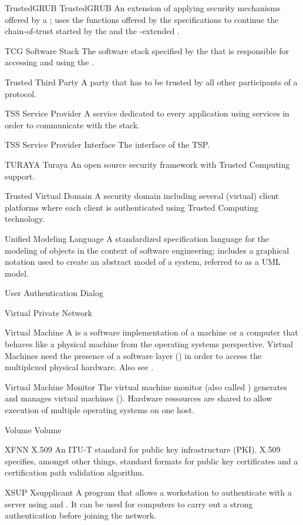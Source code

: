 \glosentry
    {TrustedGRUB}
    {TrustedGRUB}
    {An extension of \GRUB applying security mechanisms offered by a \TPM; uses
the \RTM functions offered by the \TCG specifications to continue the
chain-of-trust started by the \CRTM and the \TCG-extended \BIOS.}

    {TCG Software Stack}
    {The software stack specified by the \TCG that is responsible for
accessing and using the \TPM.}

    {Trusted Third Party}
    {A party that has to be trusted by all other participants of a protocol.}

    {TSS Service Provider}
    {A service dedicated to every application using \TSS services in
order to communicate with the \TSS stack.}

    {TSS Service Provider Interface}
    {The interface of the TSP.}

\glosentry
    {TURAYA}
    {Turaya}
    {An open source security framework with Trusted Computing support.}

    {Trusted Virtual Domain}
    {A security domain including several (virtual) client platforms where each client
     is authenticated using Trusted Computing technology.}

    {Unified Modeling Language}
    {A standardized specification language for the modeling of objects in the
context of software engineering; includes a graphical notation used to create an
abstract model of a system, referred to as a UML model.}

    {User Authentication Dialog}

    {Virtual Private Network}

    {Virtual Machine}
    {A \VM is a software implementation of a machine or a computer that behaves like a physical machine from the operating systems
     perspective. Virtual Machines need the presence of a software layer (\VMM) in order to access the multiplexed physical hardware. Also see \Compartment. }

    {Virtual Machine Monitor}
    {The virtual machine monitor (also called \Hypervisor) generates and manages virtual machines (\VM). Hardware ressources are shared to allow execution of multiple operating systems on one host.}

\glosentry
    {Volume}
    {Volume}
    {}

\glosentry
    {XFNN}
    {X.509}
    {An ITU-T standard for public key infrastructure (PKI). X.509 specifies,
amongst other things, standard formats for public key certificates and a
certification path validation algorithm.}

\glosentry
    {XSUP}
    {Xsupplicant}
    {A program that allows a workstation to authenticate with a \RADIUS server
using \SECPORT and \EAP. It can be used for computers to carry out a strong
authentication before joining the network.}
